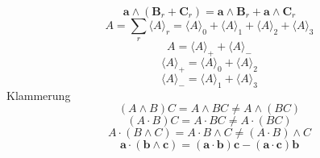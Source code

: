 \documentclass[11pt, a4paper, fleqn]{report}
\numberwithin{equation}{section}
\begin{document}
\begin{equation}\tag{2.1.9b}
    \mathbf{a}\wedge(\mathbf{B}_r+\mathbf{C}_r)=\mathbf{a}\wedge\mathbf{B}_r+\mathbf{a}\wedge\mathbf{C}_r
\end{equation}
\setcounter{equation}{9}%
\begin{equation}
    A=\sum_r\langle A\rangle_r=\langle A\rangle_0+\langle A\rangle_1+\langle A\rangle_2+\langle A\rangle_3
\end{equation}
\begin{equation}\tag{2.1.11a}
    A=\langle A\rangle_++\langle A\rangle_-
\end{equation}
\begin{equation}\tag{2.1.11b}
    \langle A\rangle_+=\langle A\rangle_0+\langle A\rangle_2
\end{equation}
\begin{equation}\tag{2.1.11c}
    \langle A\rangle_-=\langle A\rangle_1+\langle A\rangle_3
\end{equation}
Klammerung
\begin{equation}\tag{2.1.12a}
    (A \wedge B)C=A \wedge BC\neq A\wedge(BC)
\end{equation}
\begin{equation}\tag{2.1.12b}
    (A \cdot B)C=A \cdot BC\neq A\cdot(BC)
\end{equation}
\setcounter{equation}{12}%
\begin{equation}
    A \cdot (B\wedge C)=A \cdot B\wedge C\neq (A\cdot B)\wedge C
\end{equation}
\begin{equation}
    \mathbf{a}\cdot(\mathbf{b}\wedge\mathbf{c})=(\mathbf{a}\cdot\mathbf{b})\mathbf{c}-(\mathbf{a}\cdot\mathbf{c})\mathbf{b}
\end{equation}
\end{document}
